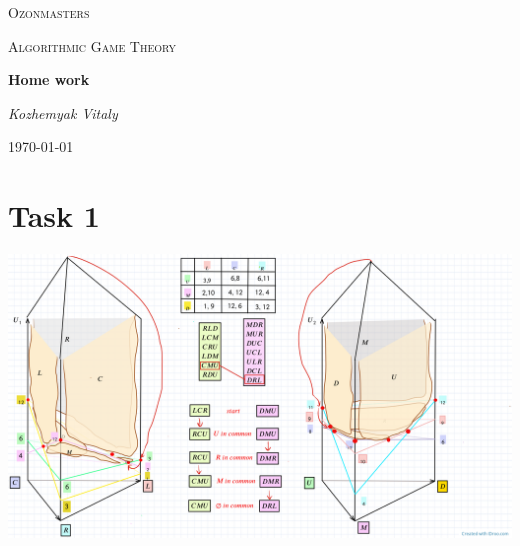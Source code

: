 \documentclass[a4paper, 12pt]{article}
\begin{document}
 

\begin{titlepage}
	\centering
	{\scshape\LARGE Ozonmasters \par}
	\vspace{1cm}
	{\scshape\Large Algorithmic Game Theory \par}
	\vspace{1.5cm}
	{\huge\bfseries Home work \par}
	\vspace{2cm}
	{\Large\itshape Kozhemyak Vitaly \par}
	\vfill

	{\large \today\par}
\end{titlepage}
  
\tableofcontents

\newpage
 
\section{Task 1}
\includegraphics[width=\textwidth]{Images/Task1.png}
\end{document}

